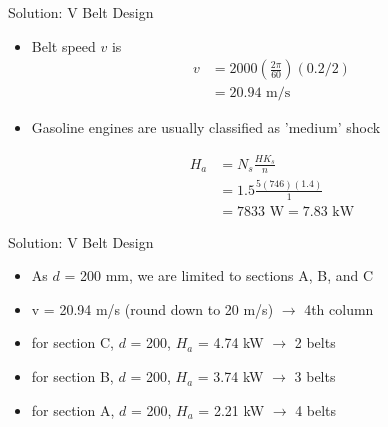 \documentclass[10pt, svgnames]{beamer}
\begin{document}
\begin{frame}[label={sec:org2871c17}]{Solution: V Belt Design}
\begin{itemize}
\item Belt speed \(v\) is
\begin{align*}
  v &= 2000 \left(\frac{2\pi}{60}\right) (0.2/2) \\
    &= 20.94 \text{ m/s}
\end{align*}

\item Gasoline engines are usually classified as 'medium' shock

\begin{align*}
  H_{a} &= N_{s} \frac{HK_{s}}{n} \\
        &= 1.5 \frac{5(746)(1.4)}{1} \\
        &= 7833 \text{ W} = 7.83 \text{ kW}
\end{align*}
\end{itemize}
\end{frame}

\begin{frame}[label={sec:org1fa3ccb}]{Solution: V Belt Design}
\begin{itemize}
\item As \(d\) =  200 mm, we are limited to sections A, B, and C

\item v = 20.94 m/s (round down to 20 m/s) \(\rightarrow\) 4th column

\item for section C, \(d\) = 200, \(H_a\) = 4.74 kW \(\rightarrow\) 2 belts
\item for section B, \(d\) = 200, \(H_a\) = 3.74 kW \(\rightarrow\) 3 belts
\item for section A, \(d\) = 200, \(H_a\) = 2.21 kW \(\rightarrow\) 4 belts
\end{itemize}
\end{frame}
\end{document}
